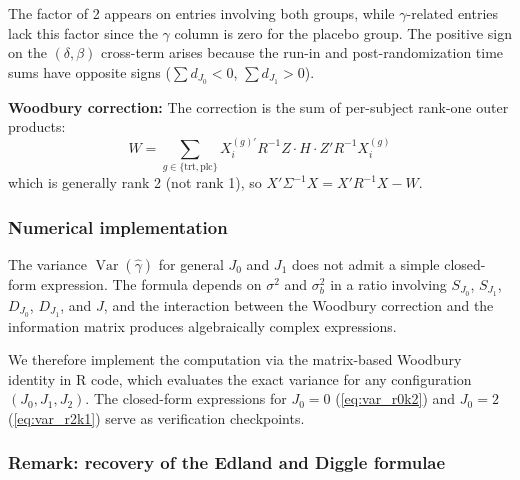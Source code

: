 \documentclass[
  11pt,
]{article}
\begin{document}
The factor of 2 appears on entries involving both groups, while
\(\gamma\)-related entries lack this factor since the \(\gamma\) column
is zero for the placebo group. The positive sign on the
\((\delta, \beta)\) cross-term arises because the run-in and
post-randomization time sums have opposite signs (\(\sum d_{J_0} < 0\),
\(\sum d_{J_1} > 0\)).

\textbf{Woodbury correction:} The correction is the sum of per-subject
rank-one outer products: \[
  W = \sum_{g \in \{\text{trt},\text{plc}\}}
    X_i^{(g)\prime} R^{-1} Z \cdot H \cdot
    Z' R^{-1} X_i^{(g)}
\] which is generally rank 2 (not rank 1), so
\(X'\Sigma^{-1}X = X'R^{-1}X - W\).

\subsubsection{Numerical implementation}\label{numerical-implementation}

The variance \(\mathop{\mathrm{Var}}(\hat{\gamma})\) for general \(J_0\)
and \(J_1\) does not admit a simple closed-form expression. The formula
depends on \(\sigma^2\) and \(\sigma_b^2\) in a ratio involving
\(S_{J_0}\), \(S_{J_1}\), \(D_{J_0}\), \(D_{J_1}\), and \(J\), and the
interaction between the Woodbury correction and the information matrix
produces algebraically complex expressions.

We therefore implement the computation via the matrix-based Woodbury
identity in R code, which evaluates the exact variance for any
configuration \((J_0, J_1, J_2)\). The closed-form expressions for
\(J_0=0\) (\ref{eq:var_r0k2}) and \(J_0=2\) (\ref{eq:var_r2k1}) serve as
verification checkpoints.

\subsubsection{Remark: recovery of the Edland and Diggle
formulae}\label{remark-recovery-of-the-edland-and-diggle-formulae}
\end{document}
